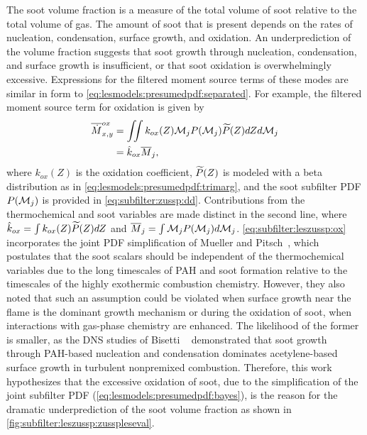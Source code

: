 The soot volume fraction is a measure of the total volume of soot relative to the total volume of gas. The amount of soot that is present depends on the rates of nucleation, condensation, surface growth, and oxidation. An underprediction of the volume fraction suggests that soot growth through nucleation, condensation, and surface growth is insufficient, or that soot oxidation is overwhelmingly excessive. Expressions for the filtered moment source terms of these modes are similar in form to \cref{eq:lesmodels:presumedpdf:separated}. For example, the filtered moment source term for oxidation is given by
\begin{equation}\label{eq:subfilter:leszussp:ox}
  \begin{split}
    \overline{\dot{M}}_{x,y}^{ox} &= \iint k_{ox}(Z)\mathcal{M}_j P(\mathcal{M}_j)\widetilde{P}(Z) dZ d\mathcal{M}_j \\
    &= \hat{k}_{ox}\overline{M}_j,
  \end{split}
\end{equation}
where $k_{ox}(Z)$ is the oxidation coefficient, $\widetilde{P}(Z)$ is modeled with a beta distribution as in \cref{eq:lesmodels:presumedpdf:trimarg}, and the soot subfilter PDF $P(\mathcal{M}_j)$ is provided in \cref{eq:subfilter:zussp:dd}. Contributions from the thermochemical and soot variables are made distinct in the second line, where $\hat{k}_{ox} = \int k_{ox}(Z)\widetilde{P}(Z) dZ$ and $\overline{M}_j = \int \mathcal{M}_j P(\mathcal{M}_j)d\mathcal{M}_j$. \cref{eq:subfilter:leszussp:ox} incorporates the joint PDF simplification of Mueller and Pitsch~\cite{subfilterpdf2011}, which postulates that the soot scalars should be independent of the thermochemical variables due to the long timescales of PAH and soot formation relative to the timescales of the highly exothermic combustion chemistry. However, they also noted that such an assumption could be violated when surface growth near the flame is the dominant growth mechanism or during the oxidation of soot, when interactions with gas-phase chemistry are enhanced. The likelihood of the former is smaller, as the DNS studies of Bisetti \etal~\cite{bisetti2012} demonstrated that soot growth through PAH-based nucleation and condensation dominates acetylene-based surface growth in turbulent nonpremixed combustion. Therefore, this work hypothesizes that the excessive oxidation of soot, due to the simplification of the joint subfilter PDF (\cref{eq:lesmodels:presumedpdf:bayes}), is the reason for the dramatic underprediction of the soot volume fraction as shown in \cref{fig:subfilter:leszussp:zusspleseval}.

